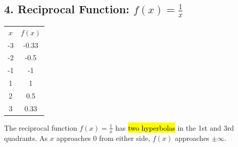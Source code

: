 \documentclass[12pt,a4paper]{article}
\begin{document}
\subsection*{4. Reciprocal Function: $f(x) = \frac{1}{x}$}
\begin{minipage}{0.5\textwidth}
\end{minipage}
\hspace{1cm}
\begin{minipage}{0.4\textwidth}
\centering
\begin{tabular}{cc}

$x$ & $f(x)$ \\

-3 & -0.33 \\
-2 & -0.5 \\
-1 & -1 \\
1 & 1 \\
2 & 0.5 \\
3 & 0.33 \\

\end{tabular}
\end{minipage}
\noindent
The reciprocal function $f(x) = \frac{1}{x}$ has \hl{two hyperbolas} in the 1st and 3rd quadrants. As $x$ approaches 0 from either side, $f(x)$ approaches $\pm\infty$. 
\end{document}

